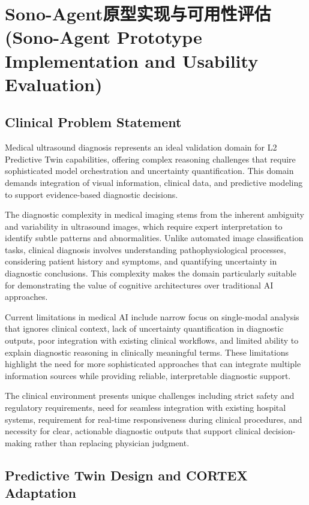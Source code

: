 
\chapter{Sono-Agent原型实现与可用性评估 (Sono-Agent Prototype Implementation and Usability Evaluation)} \label{chp:sono_agent}

\section{Clinical Problem Statement}

Medical ultrasound diagnosis represents an ideal validation domain for L2 Predictive Twin capabilities, offering complex reasoning challenges that require sophisticated model orchestration and uncertainty quantification. This domain demands integration of visual information, clinical data, and predictive modeling to support evidence-based diagnostic decisions.

The diagnostic complexity in medical imaging stems from the inherent ambiguity and variability in ultrasound images, which require expert interpretation to identify subtle patterns and abnormalities. Unlike automated image classification tasks, clinical diagnosis involves understanding pathophysiological processes, considering patient history and symptoms, and quantifying uncertainty in diagnostic conclusions. This complexity makes the domain particularly suitable for demonstrating the value of cognitive architectures over traditional AI approaches.

Current limitations in medical AI include narrow focus on single-modal analysis that ignores clinical context, lack of uncertainty quantification in diagnostic outputs, poor integration with existing clinical workflows, and limited ability to explain diagnostic reasoning in clinically meaningful terms. These limitations highlight the need for more sophisticated approaches that can integrate multiple information sources while providing reliable, interpretable diagnostic support.

The clinical environment presents unique challenges including strict safety and regulatory requirements, need for seamless integration with existing hospital systems, requirement for real-time responsiveness during clinical procedures, and necessity for clear, actionable diagnostic outputs that support clinical decision-making rather than replacing physician judgment.

\section{Predictive Twin Design and CORTEX Adaptation}

